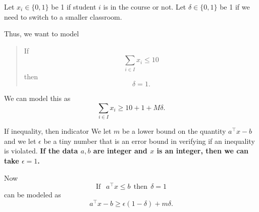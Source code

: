 Let $x_i \in \{0,1\}$ be 1 if student $i$ is in the course or not.   Let $\delta \in \{0,1\}$ be 1 if we need to switch to a smaller classroom.  

Thus, we want to model 
\begin{quote}
If $$
\sum_{i \in I} x_i \leq 10
$$
then 
$$
\delta = 1.
$$
\end{quote}

We can model this as 
\begin{equation}
\sum_{i \in I} x_i \geq 10 + 1 + M\delta.
\end{equation}


\begin{general}{If inequality, then indicator}{}
We let $m$ be a lower bound on the quantity $a^\top x - b$ and we let $\epsilon$ be a tiny number that is an error bound in verifying if an inequality is violated.  \textbf{If the data $a,b$ are integer and $x$ is an integer, then we can take $\epsilon = 1$.}

Now
\begin{equation}
\text{If } \ \ a^\top x \leq b  \ \ \text{then}\ \ \delta = 1
\end{equation}
can be modeled as 
\begin{equation}
a^\top x -b  \geq  \epsilon(1-\delta) + m \delta.
\end{equation}
\end{general}



